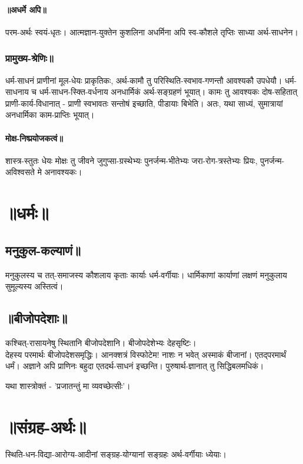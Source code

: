 \documentclass[oneside, article]{memoir}
\begin{document}
\subsubsection{॥अधर्मे अपि॥}
परम-अर्थः स्वयं-धृतः। आत्मज्ञान-युक्तेन कुशलिना अधर्मिना अपि स्व-कौशले तृप्तिः साध्या अर्थ-साधनेन।

\subsection{प्रामुख्य-श्रेणिः॥}
धर्म-साधनं प्राणीनां मूल-धेयः प्राकृतिकः, अर्थ-कामौ तु परिस्थिति-स्वभाव-गणन्तौ आवश्यकौ उपधेयौ। धर्म-साधनाय च धर्म-साधन-स्क्ति-वर्धनाय अनधार्मिकं अर्थ-सङ्ग्रहणं भूयात्। कामः तु आवश्यकः दोष-सहितात् प्राणी-कार्य-विधानात् - प्राणी स्वभावतः सन्तोषं इच्छाति, पीडायाः बिभेति। अतः, यथा साध्यं, सुमात्रायां अनधार्मिका काम-प्राप्तिः भूयात्।

\subsubsection{मोक्ष-निष्प्रयोजकत्वं॥}
शास्त्र-स्तुतः धेयः मोक्षः तु जीवने जुगुप्सा-ग्रस्थेभ्यः पुनर्जन्म-भीतेभ्यः जरा-रोग-त्रस्तेभ्यः प्रियः, पुनर्जन्म-अविश्वसते मे अनावश्यकः।

\chapter{॥धर्मः॥}
\section{मनुकुल-कल्याणं॥}
मनुकुलस्य च तत्-समाजस्य कौशलाय कृताः कार्याः धर्म-वर्गीयाः। धार्मिकाणां कार्याणां लक्षणं मनुकुलाय सुमूल्यस्य अस्तित्वं।

\section{॥बीजोपदेशाः॥}
कश्चित्-रासायनेषु स्थितानि बीजोपदेशानि। बीजोपदेशेभ्यः देहसृष्टिः। \\देहस्य परमार्थः बीजोपदेशसमृद्धिः। आनक्शत्रं विस्फोटेम! नाशः न भवेत् अस्माकं बीजानां। एतद्परमार्थं धर्मं। अज्ञाने अपि प्राणिनः बहुदा एतदर्थ-साधनं इच्छन्ति। पुरुषार्थ-ज्ञानात् तु सिद्धिबलमधिकं।

यथा शास्त्रोक्तं - 'प्रजातन्तुं मा व्यवच्छेत्सीः'।

\chapter{॥संग्रह-अर्थः॥}
स्थिति-धन-विद्या-आरोग्य-आदीनां सङ्ग्रह-योग्यानां सङ्ग्रहः अर्थ-वर्गीयाः ध्येयाः।
\end{document}
